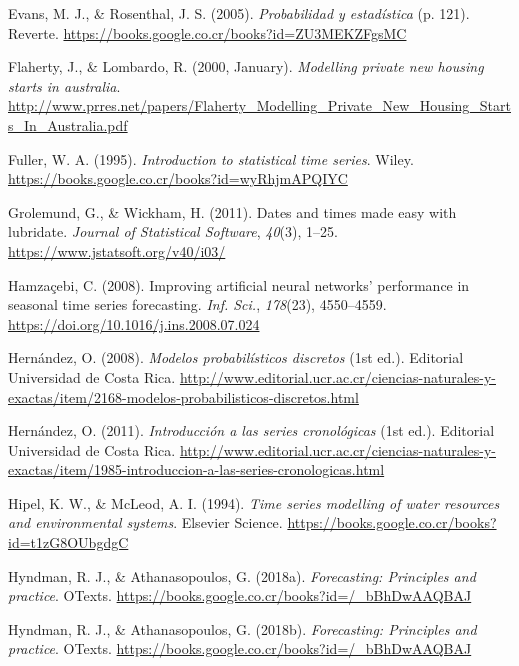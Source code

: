 \documentclass[
]{article}
\newlength{\cslhangindent}
\newlength{\cslentryspacingunit} %
\newenvironment{CSLReferences}[2] %
 {%
  \setlength{\parindent}{0pt}
  \ifodd #1
  \let\oldpar\par
  \def\par{\hangindent=\cslhangindent\oldpar}
  \fi
  \setlength{\parskip}{#2\cslentryspacingunit}
 }%
 {}
\begin{document}
\begin{CSLReferences}{1}{0}
\leavevmode{}%
Evans, M. J., \& Rosenthal, J. S. (2005). \emph{Probabilidad y
estadística} (p. 121). Reverte.
\url{https://books.google.co.cr/books?id=ZU3MEKZFgsMC}

\leavevmode{}%
Flaherty, J., \& Lombardo, R. (2000, January). \emph{Modelling private
new housing starts in australia}.
\url{http://www.prres.net/papers/Flaherty_Modelling_Private_New_Housing_Starts_In_Australia.pdf}

\leavevmode{}%
Fuller, W. A. (1995). \emph{Introduction to statistical time series}.
Wiley. \url{https://books.google.co.cr/books?id=wyRhjmAPQIYC}

\leavevmode{}%
Grolemund, G., \& Wickham, H. (2011). Dates and times made easy with
{lubridate}. \emph{Journal of Statistical Software}, \emph{40}(3),
1--25. \url{https://www.jstatsoft.org/v40/i03/}

\leavevmode{}%
Hamzaçebi, C. (2008). Improving artificial neural networks' performance
in seasonal time series forecasting. \emph{Inf. Sci.}, \emph{178}(23),
4550--4559. \url{https://doi.org/10.1016/j.ins.2008.07.024}

\leavevmode{}%
Hernández, O. (2008). \emph{Modelos probabilísticos discretos} (1st
ed.). Editorial Universidad de Costa Rica.
\url{http://www.editorial.ucr.ac.cr/ciencias-naturales-y-exactas/item/2168-modelos-probabilisticos-discretos.html}

\leavevmode{}%
Hernández, O. (2011). \emph{Introducción a las series cronológicas} (1st
ed.). Editorial Universidad de Costa Rica.
\url{http://www.editorial.ucr.ac.cr/ciencias-naturales-y-exactas/item/1985-introduccion-a-las-series-cronologicas.html}

\leavevmode{}%
Hipel, K. W., \& McLeod, A. I. (1994). \emph{Time series modelling of
water resources and environmental systems}. Elsevier Science.
\url{https://books.google.co.cr/books?id=t1zG8OUbgdgC}

\leavevmode{}%
Hyndman, R. J., \& Athanasopoulos, G. (2018a). \emph{Forecasting:
Principles and practice}. OTexts.
\url{https://books.google.co.cr/books?id=/_bBhDwAAQBAJ}

\leavevmode{}%
Hyndman, R. J., \& Athanasopoulos, G. (2018b). \emph{Forecasting:
Principles and practice}. OTexts.
\url{https://books.google.co.cr/books?id=/_bBhDwAAQBAJ}


\end{CSLReferences}
\end{document}
